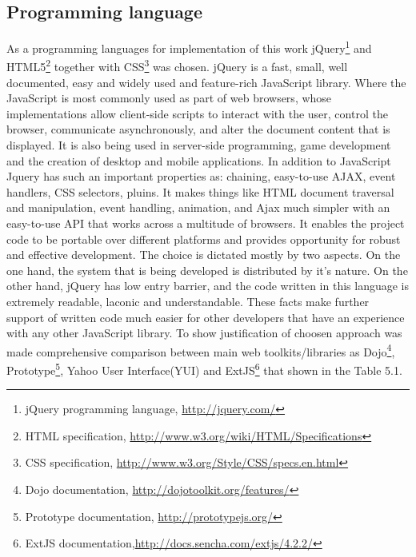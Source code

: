  \subsection{Programming language}
	As a programming languages for implementation of this work jQuery\footnote{jQuery programming language, \url{http://jquery.com/}} and HTML5\footnote{HTML specification, \url{http://www.w3.org/wiki/HTML/Specifications}} together with CSS\footnote{CSS specification, \url{http://www.w3.org/Style/CSS/specs.en.html}} was chosen. jQuery is a fast, small, well documented, easy and widely used and feature-rich JavaScript library. Where the JavaScript is most commonly used as part of web browsers, whose implementations allow client-side scripts to interact with the user, control the browser, communicate asynchronously, and alter the document content that is displayed. It is also being used in server-side programming, game development and the creation of desktop and mobile applications. In addition to JavaScript Jquery has such an important properties as: chaining, easy-to-use AJAX, event handlers, CSS selectors, pluins. It makes things like HTML document traversal and manipulation, event handling, animation, and Ajax much simpler with an easy-to-use API that works across a multitude of browsers. It enables the project code to be portable over different platforms and provides opportunity for robust and effective development. The choice is dictated mostly by two aspects. On the one hand, the system that is being developed is distributed by it's nature. On the other hand, jQuery has low entry barrier, and the code written in this language is extremely readable, laconic and understandable. These facts make further support of written code much easier for other developers that have an experience with any other JavaScript library. 
	\newline
	To show justification of choosen approach was made comprehensive comparison between main web toolkits/libraries as Dojo\footnote{Dojo documentation, \url{http://dojotoolkit.org/features/}}, Prototype\footnote{Prototype documentation, \url{http://prototypejs.org/}}, Yahoo User Interface(YUI) and ExtJS\footnote{ExtJS documentation,\url{http://docs.sencha.com/extjs/4.2.2/}} that shown in the Table 5.1. 
